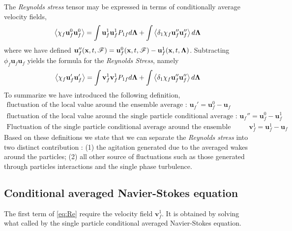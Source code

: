 The \textit{Reynolds stress} tensor may be expressed in terms of conditionally average velocity fields, 
\begin{equation}
    \left<\chi_f\textbf{u}_f^0 \textbf{u}_f^0\right>
    = 
    \int \textbf{u}_f^1\textbf{u}_f^1 P_{1f} d\bm\Lambda
    + 
    \int \left<\delta_1 \chi_f\textbf{u}_f'' \textbf{u}_f''\right> d\bm\Lambda
\end{equation}
where we have defined $\textbf{u}_f''(\textbf{x},t,\mathscr{F}) = \textbf{u}^0_f(\textbf{x},t,\mathscr{F}) -\textbf{u}^1_f(\textbf{x},t,\bm\Lambda)$. 
Subtracting $\phi_f \textbf{u}_f\textbf{u}_f$ yields the formula for the \textit{Reynolds Stress}, namely 
\begin{equation}
    \left<\chi_f\textbf{u}_f' \textbf{u}_f'\right>
    = 
    \int \textbf{v}_f^1\textbf{v}_f^1 P_{1f} d\bm\Lambda
    + 
    \int \left<\delta_1 \chi_f\textbf{u}_f'' \textbf{u}_f''\right> d\bm\Lambda
    \label{eq:Re}
\end{equation}
To summarize we have introduced the following definition, 
\begin{align*}
    \text{fluctuation of the local value around the ensemble average : }\textbf{u}_f' = \textbf{u}_f^0 - \textbf{u}_f\\
    \text{fluctuation of the local value around the single particle conditional average : }\textbf{u}_f'' = \textbf{u}_f^0 - \textbf{u}_f^1\\
    \text{Fluctuation of the single particle conditional average around the ensemble average : }\textbf{v}_f^1 = \textbf{u}_f^1 - \textbf{u}_f
\end{align*}
Based on these definitions we state that we can separate the \textit{Reynolds stress} into two distinct contribution :  (1) the agitation generated due to the averaged wakes around the particles; (2) all other source of fluctuations such as those generated through particles interactions and the single phase turbulence. 

\subsection{Conditional averaged Navier-Stokes equation}

The first term of \ref{eq:Re} require the velocity field $\textbf{v}_f^1$. 
It is obtained by solving what called by \citet{hinch1977averaged} the single particle conditional averaged Navier-Stokes equation. 

